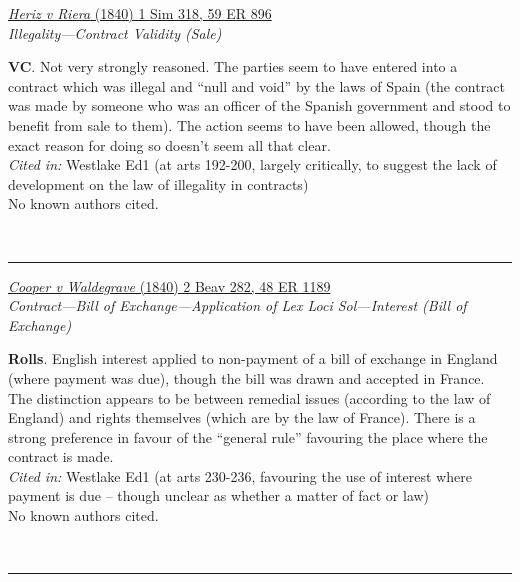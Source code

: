 \documentclass[twoside]{article}
\begin{document}
        \begin{small}
        \begin{center}
        \href{https://heinonline.org/HOL/P?h=hein.engrep/engre0059&i=904}{\textit{Heriz v Riera} (1840) 1 Sim 318, 59 ER 896} \label{87} \\ 
\textit{Illegality---Contract Validity (Sale)}\\
        \end{center}
        \textbf{VC}. Not very strongly reasoned. The parties seem to have entered into a contract which was illegal and “null and void” by the laws of Spain (the contract was made by someone who was an officer of the Spanish government and stood to benefit from sale to them). The action seems to have been allowed, though the exact reason for doing so doesn’t seem all that clear.\\\textit{Cited in: }Westlake Ed1 (at arts 192-200, largely critically, to suggest the lack of development on the law of illegality in contracts)\\No known authors cited.
        \end{small}\\
        \rule{\textwidth}{0.5pt}
        

        \begin{small}
        \begin{center}
        \href{https://heinonline.org/HOL/P?h=hein.engrep/engrd0048&i=1197}{\textit{Cooper v Waldegrave} (1840) 2 Beav 282, 48 ER 1189} \label{94} \\ 
\textit{Contract---Bill of Exchange---Application of Lex Loci Sol---Interest (Bill of Exchange)}\\
        \end{center}
        \textbf{Rolls}. English interest applied to non-payment of a bill of exchange in England (where payment was due), though the bill was drawn and accepted in France. The distinction appears to be between remedial issues (according to the law of England) and rights themselves (which are by the law of France). There is a strong preference in favour of the “general rule” favouring the place where the contract is made.\\\textit{Cited in: }Westlake Ed1 (at arts 230-236, favouring the use of interest where payment is due – though unclear as whether a matter of fact or law)\\No known authors cited.
        \end{small}\\
        \rule{\textwidth}{0.5pt}
        
\end{document}
